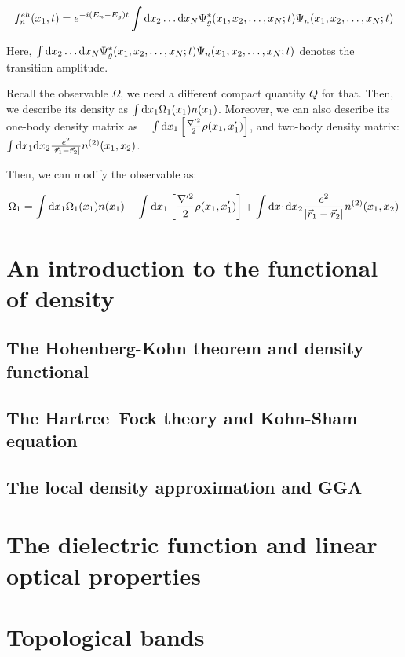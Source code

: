 \begin{equation}
f_n^{eh}(x_1,t)=e^{-i(E_n-E_g)t}\int{\rm d}x_2\dots{\rm d}x_N\Psi_g^*(x_1,x_2,\dots,x_N;t)\Psi_n(x_1,x_2,\dots,x_N;t)
\label{mod_transition_one-body}
\end{equation}

Here, $\int{\rm d}x_2\dots{\rm d}x_N\Psi_g^*(x_1,x_2,\dots,x_N;t)\Psi_n(x_1,x_2,\dots,x_N;t)$ denotes
the transition amplitude.

Recall the observable $\Omega$, we need a different compact quantity $Q$ for that. Then, we describe its density as $\int{\rm d}x_1\Omega_1(x_1)n(x_1)$. Moreover, we can also describe its one-body density matrix as $-\int{\rm d}x_1\left[ \frac{\nabla^{\prime 2}}{2}\rho(x_1,x^\prime_1)\right]$, and two-body density matrix: $\int{\rm d}x_1{\rm d}x_2\frac{e^2}{|\vec{r}_1-\vec{r}_2|}n^{(2)}(x_1,x_2)$.

Then, we can modify the observable as:

\begin{equation}
\Omega_1 =\int{\rm d}x_1\Omega_1(x_1)n(x_1)-\int{\rm d}x_1\left[ \frac{\nabla^{\prime 2}}{2}\rho(x_1,x^\prime_1)\right]+\int{\rm d}x_1{\rm d}x_2\frac{e^2}{|\vec{r}_1-\vec{r}_2|}n^{(2)}(x_1,x_2)
\label{mod_obs}
\end{equation}







\newpage
\section{An introduction to the functional of density}

\subsection{The Hohenberg-Kohn theorem and density functional}

\subsection{The Hartree–Fock theory and Kohn-Sham equation}

\subsection{The local density approximation and GGA}

\newpage
\section{The dielectric function and linear optical properties}

\newpage
\section{Topological bands}
